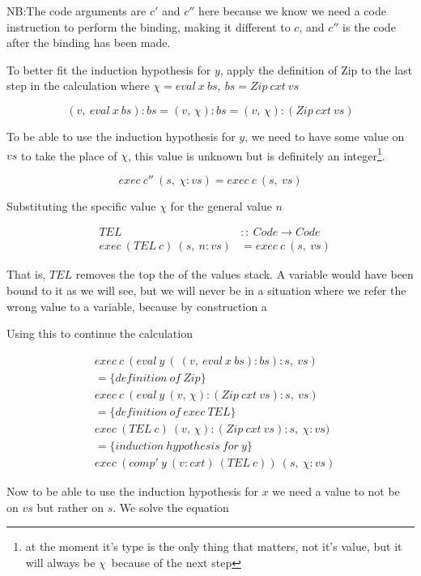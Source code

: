 \documentclass {article}
\begin{document}
NB:The code arguments are $c'$ and $c''$ 
here because we know we need a code instruction
to perform the binding, making it different to $c$,
and $c''$ is the code after the binding has been made.

To better fit the induction hypothesis for $y$,
apply the definition of Zip to the last step in the calculation
where \( \chi = eval\ x\ bs,\ bs = Zip\ cxt\ vs \)

\[ (v,\ eval\ x\ bs) :bs = (v,\, \chi):bs = (v,\, \chi):(Zip\ cxt\ vs) \]

To be able to use the induction hypothesis for $y$,
we need to have some value on $vs$ to take the place of $\chi$,
this value is unknown but is definitely an integer\footnote{
at the moment it's
type is the only thing that matters, not it's value,
but it will always be $\chi$\ because of the next step}.

\[ exec\ c''\ (s,\ \chi : vs) = exec\ c\ (s,\ vs) \]

Substituting the specific value $\chi$ for the general value $n$

\begin{eqnarray*}
&TEL\ &::\ Code \rightarrow Code \\
&exec\ (TEL\ c)\ (s,\ n:vs) &= exec\ c\ (s,\ vs)
\end{eqnarray*}

That is, $TEL$ removes the top the of the values stack.
A variable would have been bound to it as we will see,
but we will never be in a situation where we refer the wrong
value to a variable, because by construction a 

Using this to continue the calculation

\begin{align*}
&exec\ c\ (eval\ y\ (\ (v,\ eval\ x\ bs) :bs) : s,\ vs) \\
&= \{ definition\ of\ Zip \} \\
&exec\ c\ (eval\ y\ (v,\, \chi):(Zip\ cxt\ vs) : s,\ vs) \\
&= \{ definition\ of\ exec\ TEL\} \\
&exec\ (TEL\ c)\ (v,\, \chi):(Zip\ cxt\ vs) : s,\ \chi : vs) \\
&= \{ induction\ hypothesis\ for\ y \} \\
&exec\ (comp'\ y\ (v:cxt)\ (TEL\ c))\ (s,\ \chi : vs)
\end{align*}

Now to be able to use the induction hypothesis for $x$
we need a value to not be on $vs$ but rather on $s$.
We solve the equation 
\end{document}

